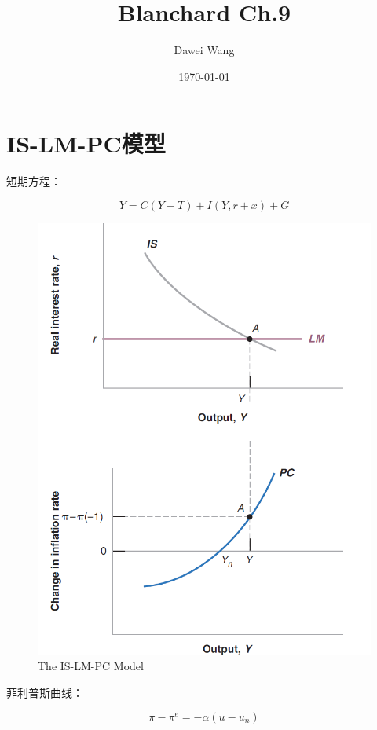 \documentclass{article}
\title{Blanchard Ch.9}
\author{Dawei Wang}
\date{\today}
\begin{document}
	\maketitle
\section{IS-LM-PC模型}

短期方程：

\[
Y=C(Y-T)+I(Y,r+x)+G
\]

\begin{figure}[H] %
	\centering %
	\includegraphics[width=1\textwidth]{9_1} %
	\caption{The IS-LM-PC Model} %
	\label{Fig.main2} %
\end{figure}

菲利普斯曲线：

\[
\pi-\pi^e=-\alpha(u-u_n)
\]
\end{document}

